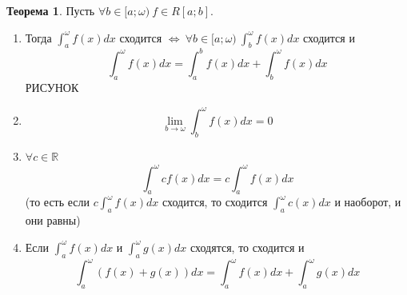 \documentclass{report}
\theoremstyle{definition}
\newtheorem{theorem}{Теорема}[section]
\begin{document}
\begin{theorem}
  Пусть $\forall b\in [a;\omega) \ f\in R[a;b]$.
  \begin{enumerate}
    \item Тогда $\int_{a}^{\omega}f(x)dx$ сходится $\iff \ \forall
            b\in[a;\omega) \ \int_{b}^{\omega}f(x)dx$ сходится и
          \begin{equation*}
            \int_{a}^{\omega}f(x)dx = \int_{a}^{b}f(x)dx + \int_{b}^{\omega} f(x)dx
          \end{equation*}
          {\Large РИСУНОК}
    \item
          \begin{equation*}
            \underset{b\rightarrow\omega}{\lim}\int_{b}^{\omega}f(x)dx = 0
          \end{equation*}
    \item $\forall c \in \mathbb{R}$
          \begin{equation*}
            \int_{a}^{\omega}cf(x)dx = c\int_{a}^{\omega}f(x)dx
          \end{equation*}
          (то есть если $c\int_{a}^{\omega}f(x)dx$ сходится, то сходится $\int_{a}^{\omega}c(x)dx$ и наоборот,
          и они равны)
    \item Если $\int_{a}^{\omega}f(x)dx$ и $\int_{a}^{\omega}g(x)dx$ сходятся, то сходится и
          \begin{equation*}
            \int_{a}^{\omega}(f(x) + g(x))dx = \int_{a}^{\omega}f(x)dx + \int_{a}^{\omega}g(x)dx
          \end{equation*}
  \end{enumerate}
\end{theorem}
\end{document}

